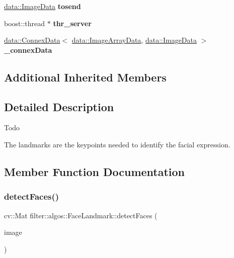 \begin{DoxyCompactItemize}
\hyperlink{classfilter_1_1data_1_1_image_data}{data\+::\+Image\+Data} {\bfseries tosend}
\item 
\mbox{\label{classfilter_1_1algos_1_1_face_landmark_a7051048368fc84b6361b484171596684}} 
boost\+::thread $\ast$ {\bfseries thr\+\_\+server}
\item 
\mbox{\label{classfilter_1_1algos_1_1_face_landmark_aa9074b9b1af3d43bdc61aae926a144f5}} 
\hyperlink{classfilter_1_1data_1_1_connex_data}{data\+::\+Connex\+Data}$<$ \hyperlink{classfilter_1_1data_1_1_image_array_data}{data\+::\+Image\+Array\+Data}, \hyperlink{classfilter_1_1data_1_1_image_data}{data\+::\+Image\+Data} $>$ {\bfseries \+\_\+connex\+Data}
\end{DoxyCompactItemize}
\subsection*{Additional Inherited Members}


\subsection{Detailed Description}
\begin{DoxyRefDesc}{Todo}
\item[\hyperlink{todo__todo000009}{Todo}]\end{DoxyRefDesc}
The landmarks are the keypoints needed to identify the facial expression. 

\subsection{Member Function Documentation}
\mbox{\label{classfilter_1_1algos_1_1_face_landmark_a333f1eb7faccf486e00d654a0f396ae9}} 
\subsubsection{\texorpdfstring{detect\+Faces()}{detectFaces()}}
{\footnotesize\ttfamily cv\+::\+Mat filter\+::algos\+::\+Face\+Landmark\+::detect\+Faces (\begin{DoxyParamCaption}\item[{const \hyperlink{classfilter_1_1data_1_1_image_data}{data\+::\+Image\+Data} \&}]{image }\end{DoxyParamCaption})}


